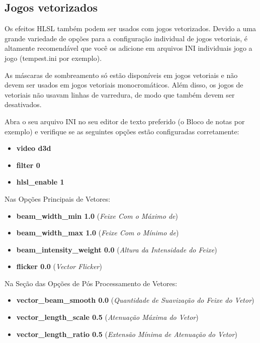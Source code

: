 \documentclass[letterpaper,10pt,brazil]{sphinxmanual}
\begin{document}
\subsection{Jogos vetorizados}
\label{advanced/hlsl:jogos-vetorizados}
Os efeitos HLSL também podem ser usados com jogos vetorizados. Devido a
uma grande variedade de opções para a configuração individual de jogos
vetoriais, é altamente recomendável que você os adicione em arquivos INI
individuais jogo a jogo (tempest.ini por exemplo).

As máscaras de sombreamento só estão disponíveis em jogos vetoriais e
não devem ser usados em jogos vetoriais monocromáticos. Além disso, os
jogos de vetoriais não usavam linhas de varredura, de modo que também
devem ser desativados.

Abra o seu arquivo INI no seu editor de texto preferido (o Bloco de
notas por exemplo) e verifique se as seguintes opções estão configuradas
corretamente:
\begin{itemize}
\item {} 
\textbf{video d3d}

\item {} 
\textbf{filter 0}

\item {} 
\textbf{hlsl\_enable 1}

\end{itemize}

Nas Opções Principais de Vetores:
\begin{itemize}
\item {} 
\textbf{beam\_width\_min 1.0} (\emph{Feixe Com o Máximo de})

\item {} 
\textbf{beam\_width\_max 1.0} (\emph{Feixe Com o Mínimo de})

\item {} 
\textbf{beam\_intensity\_weight 0.0} (\emph{Altura da Intensidade do Feixe})

\item {} 
\textbf{flicker 0.0} (\emph{Vector Flicker})

\end{itemize}

Na Seção das Opções de Pós Processamento de Vetores:
\begin{itemize}
\item {} 
\textbf{vector\_beam\_smooth 0.0} (\emph{Quantidade de Suavização do Feixe do
Vetor})

\item {} 
\textbf{vector\_length\_scale 0.5} (\emph{Atenuação Máxima do Vetor})

\item {} 
\textbf{vector\_length\_ratio 0.5} (\emph{Extensão Mínima de Atenuação do Vetor})

\end{itemize}
\end{document}
